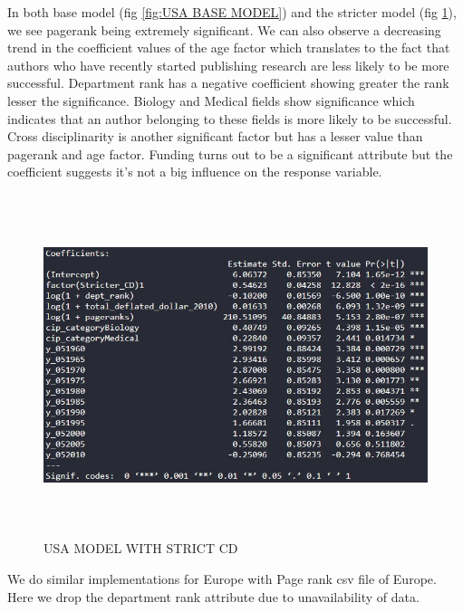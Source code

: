 \documentclass[a4paper,11pt]{article}
\theoremstyle{mytheor}
\begin{document}
In both base model  (fig \ref{fig:USA BASE MODEL}) and the stricter model (fig \ref{fig:USA STRICT CORRELATION}), we see pagerank being extremely significant. We can also observe a decreasing trend in the coefficient values of the age factor which translates to the fact that authors who have recently started publishing research are less likely to be more successful. Department rank has a negative coefficient showing greater the rank lesser the significance. Biology and Medical fields show significance which indicates that an author belonging to these fields is more likely to be successful. Cross disciplinarity is another significant factor but has a lesser value than pagerank and age factor. Funding turns out to be a significant attribute but the coefficient suggests it's not a big influence on the response variable. \\

\begin{figure}[h]
    \centering
    \includegraphics[width=16cm, height=10cm]{usa_coeff_str.jpg}
    \caption{USA MODEL WITH STRICT CD}
    \label{fig:USA STRICT CORRELATION}
\end{figure} 
\FloatBarrier




We do similar implementations for Europe with Page rank csv file of Europe. Here we drop the department rank attribute due to unavailability of data.
\end{document}
